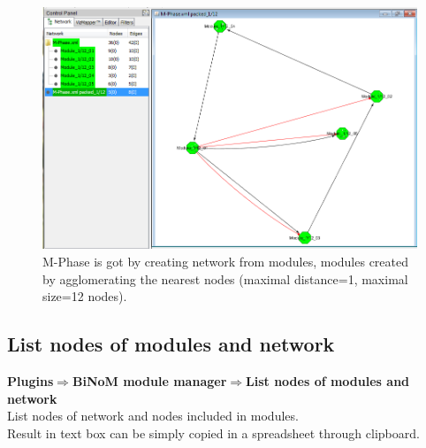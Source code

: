 \begin{figure}
\centering
\includegraphics[width=19 cm]{graphics/M-Phase_packed}
\caption{M-Phase is got by creating network from modules, modules created by agglomerating the nearest nodes (maximal distance=1, maximal size=12 nodes).}
\label{M-Phase_packed}
\end{figure}

\subsection{List nodes of modules and network}
\textbf{Plugins$\Rightarrow$BiNoM module manager$\Rightarrow$List nodes of modules and network}\\
List nodes of network and nodes included in modules.\\
Result in text box can be simply copied in a spreadsheet through clipboard.

